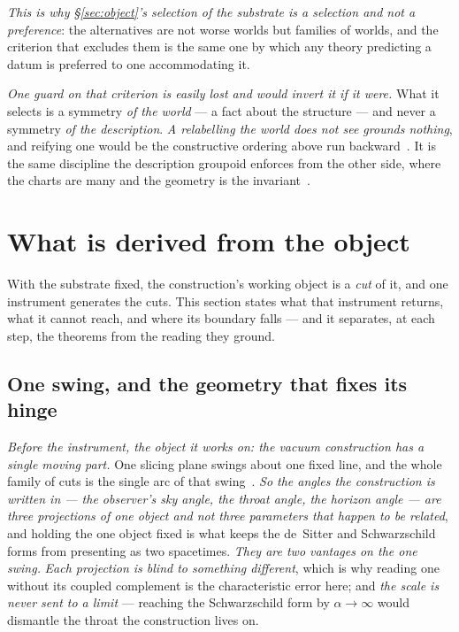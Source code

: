 \documentclass[11pt,a4paper]{article}
\theoremstyle{plain}
\theoremstyle{definition}
\begin{document}
\emph{This is why \S\ref{sec:object}'s selection of the substrate is a selection and not a preference}: the
alternatives are not worse worlds but families of worlds, and the criterion that excludes them is the same one
by which any theory predicting a datum is preferred to one accommodating it.

\emph{One guard on that criterion is easily lost and would invert it if it were.} What it selects is a
symmetry \emph{of the world} --- a fact about the structure --- and never a symmetry \emph{of the
description}. \emph{A relabelling the world does not see grounds nothing}, and reifying one would be the
constructive ordering above run backward~\cite{JanzenShadowExistence}. It is the same discipline the
description groupoid enforces from the other side, where the charts are many and the geometry is the
invariant~\cite{JanzenGroupoid}.


\section{What is derived from the object}\label{sec:derived}

With the substrate fixed, the construction's working object is a \emph{cut} of it, and one instrument
generates the cuts. This section states what that instrument returns, what it cannot reach, and where its
boundary falls --- and it separates, at each step, the theorems from the reading they ground.

\subsection{One swing, and the geometry that fixes its hinge}

\emph{Before the instrument, the object it works on: the vacuum construction has a single moving part.} One
slicing plane swings about one fixed line, and the whole family of cuts is the single arc of that
swing~\cite{JanzenSlicing}. \emph{So the angles the construction is written in --- the observer's sky angle,
the throat angle, the horizon angle --- are three projections of one object and not three parameters that
happen to be related}, and holding the one object fixed is what keeps the de~Sitter and Schwarzschild forms
from presenting as two spacetimes. \emph{They are two vantages on the one swing.} \emph{Each projection is
blind to something different}, which is why reading one without its coupled complement is the characteristic
error here; and \emph{the scale is never sent to a limit} --- reaching the Schwarzschild form by
$\alpha\to\infty$ would dismantle the throat the construction lives on.
\end{document}
